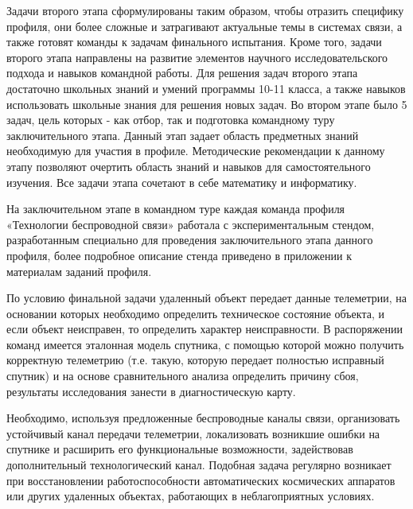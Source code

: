 Задачи второго этапа сформулированы таким образом, чтобы отразить специфику профиля, они более сложные и затрагивают актуальные темы в системах связи, а также готовят команды к задачам финального испытания. Кроме того, задачи второго этапа направлены на развитие  элементов научного исследовательского подхода и навыков командной работы. Для решения задач второго этапа достаточно школьных знаний и умений программы 10-11 класса, а также навыков использовать школьные знания для решения новых задач. Во втором этапе было 5 задач, цель которых - как отбор, так и подготовка командному туру заключительного этапа.  Данный этап задает область предметных знаний необходимую для участия в профиле. Методические рекомендации к данному этапу позволяют очертить область знаний и навыков для самостоятельного изучения. Все задачи этапа сочетают в себе математику и информатику. 

На заключительном этапе в командном туре каждая команда профиля «Технологии беспроводной связи» работала с экспериментальным стендом, разработанным специально для проведения заключительного этапа данного профиля, более подробное описание стенда приведено в приложении к материалам заданий профиля.

По условию финальной задачи удаленный объект передает данные телеметрии, на основании которых необходимо определить техническое состояние объекта, и если объект неисправен, то определить характер неисправности. В распоряжении команд имеется эталонная модель спутника, с помощью которой можно получить корректную телеметрию (т.е. такую, которую передает полностью исправный спутник) и на основе сравнительного анализа определить причину сбоя, результаты исследования занести в диагностическую карту.

Необходимо, используя предложенные беспроводные каналы связи, организовать устойчивый канал передачи телеметрии, локализовать возникшие ошибки на спутнике и расширить его функциональные возможности, задействовав дополнительный технологический канал. Подобная задача регулярно возникает при восстановлении работоспособности автоматических космических аппаратов или других удаленных объектах, работающих в неблагоприятных условиях.

